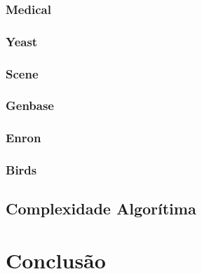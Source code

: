 \subsection{Medical}
\subsection{Yeast}
\subsection{Scene}
\subsection{Genbase}
\subsection{Enron}
\subsection{Birds}

\section{Complexidade Algorítima}




\chapter{Conclusão}